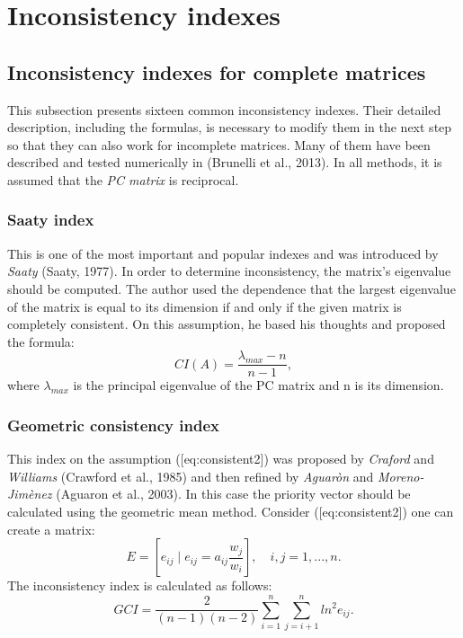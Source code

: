 \chapter{Inconsistency indexes}
\label{sec:inconsistencyIndexes}
\section{Inconsistency indexes for complete matrices}

This subsection presents sixteen common inconsistency indexes. Their detailed description, including the formulas, is necessary to modify them in the next step so that they can also work for incomplete matrices. Many of them have been described and tested numerically in (Brunelli et al., 2013). In all methods, it is assumed that the \textit{PC matrix} is reciprocal.


 \subsection{Saaty index}

This is one of the most important and popular indexes and was introduced by \textit{Saaty} (Saaty, 1977). In order to determine inconsistency, the matrix's eigenvalue should be computed. The author used the dependence that the largest eigenvalue of the matrix is equal to its dimension if and only if the given matrix is completely consistent. On this assumption, he based his thoughts and proposed the formula:
	\begin{equation} 
		CI(A)=\frac{\lambda_{max}-n}{n-1},
	 \end{equation}
 where $\lambda_{max}$
  is the principal eigenvalue of the PC matrix and n
  is its dimension.


\subsection{Geometric consistency index}

This index on the assumption ([eq:consistent2]) was proposed by \textit{Craford} and \textit{Williams} (Crawford et al., 1985) and then refined by \textit{Aguaròn} and \textit{Moreno-Jimènez} (Aguaron et al., 2003). In this case the priority vector should be calculated using the geometric mean method. Consider ([eq:consistent2]) one can create a matrix:
	\begin{equation} 
		E=\left[e_{ij}\mid e_{ij}=a_{ij}\frac{w_{j}}{w_{i}}\right],\,\,\,\,\,\,i,j=1,...,n.
	 \end{equation}
 The inconsistency index is calculated as follows:
 	\begin{equation} 
		GCI=\frac{2}{(n-1)(n-2)}\sum_{i=1}^{n}\sum_{j=i+1}^{n}ln^{2}e_{ij}.
	 \end{equation}
 

